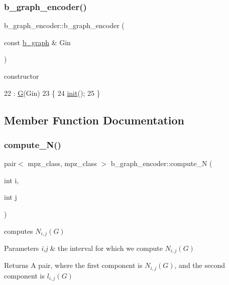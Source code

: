 \subsubsection{\texorpdfstring{b\+\_\+graph\+\_\+encoder()}{b\_graph\_encoder()}}
{\footnotesize\ttfamily b\+\_\+graph\+\_\+encoder\+::b\+\_\+graph\+\_\+encoder (\begin{DoxyParamCaption}\item[{const \hyperlink{classb__graph}{b\+\_\+graph} \&}]{Gin }\end{DoxyParamCaption})\hspace{0.3cm}{\ttfamily [inline]}}



constructor 


\begin{DoxyCode}
22                                      : \hyperlink{classb__graph__encoder_af969e24f445db0e54513086604e2c165}{G}(Gin)
23   \{
24     \hyperlink{classb__graph__encoder_a844cff8771a706d4de2abeec1312ff04}{init}();
25   \}
\end{DoxyCode}


\subsection{Member Function Documentation}
\mbox{\label{classb__graph__encoder_a58e4aae68aab6cd8e4d34fc6b658c380}} 
\subsubsection{\texorpdfstring{compute\+\_\+\+N()}{compute\_N()}}
{\footnotesize\ttfamily pair$<$ mpz\+\_\+class, mpz\+\_\+class $>$ b\+\_\+graph\+\_\+encoder\+::compute\+\_\+N (\begin{DoxyParamCaption}\item[{int}]{i,  }\item[{int}]{j }\end{DoxyParamCaption})}



computes $N_{i,j}(G)$ 


\begin{DoxyParams}{Parameters}
{\em i,j} & the interval for which we compute $N_{i,j}(G)$ \\
\hline
\end{DoxyParams}
\begin{DoxyReturn}{Returns}
A pair, where the first component is $N_{i,j}(G)$, and the second component is $l_{i,j}(G)$ 
\end{DoxyReturn}

